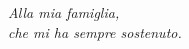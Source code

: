 \pagestyle{empty}

\begin{flushright} 
  \emph{Alla mia famiglia, \\ che mi ha sempre sostenuto.}
\end{flushright}
